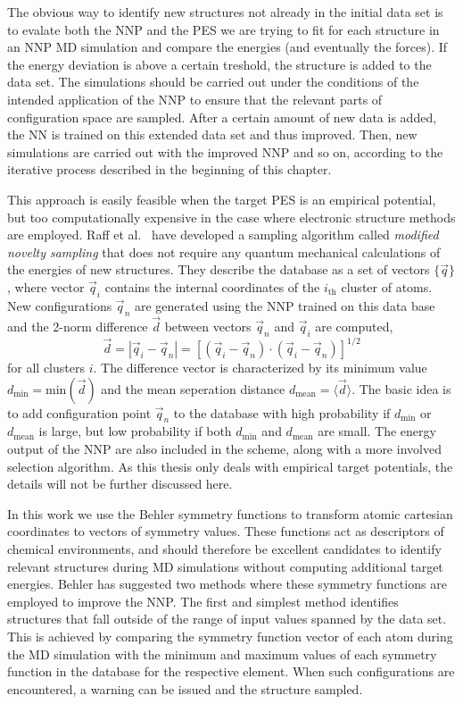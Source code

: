 \documentclass[twoside,english]{uiofysmaster}
\begin{document}
The obvious way to identify new structures not already in the initial data set is to evalate both the NNP and 
the PES we are trying to fit for each structure in an NNP MD simulation and compare the energies (and eventually 
the forces). If the energy deviation is above a certain treshold, the structure is added to the data set.
The simulations should be carried out under the conditions of the intended application of the NNP to ensure
that the relevant parts of configuration space are sampled.
After a certain amount of new data is added, 
the NN is trained on this extended data set and thus improved. Then, new simulations are carried out with the improved
NNP and so on, according to the iterative process described in the beginning of this chapter. 

This approach is easily feasible when the target PES is an empirical potential, but too computationally expensive 
in the case where electronic structure methods are employed. Raff et al.\ \cite{Raff05} have developed a sampling
algorithm called \textit{modified novelty sampling} that does not require any quantum mechanical calculations of
the energies of new structures. They describe the database as a set of vectors $\{\vec{q}\}$, where vector
$\vec{q}_i$ contains the internal coordinates of the $i_\textrm{th}$ cluster of atoms. New configurations
$\vec{q}_n$ are generated using the NNP trained on this data base and the 2-norm difference $\vec{d}$ between vectors
$\vec{q}_n$ and $\vec{q}_i$ are computed,
\begin{equation}
 \vec{d} = | \vec{q}_i - \vec{q}_n | = 
 \left[(\vec{q}_i - \vec{q}_n)\cdot(\vec{q}_i - \vec{q}_n)\right]^{1/2}
\end{equation}
for all clusters $i$. The difference vector is characterized by its minimum value $d_\textrm{min} = \textrm{min}(\vec{d})$ and 
the mean seperation distance $d_\textrm{mean} = \langle\vec{d}\rangle$. 
The basic idea is to add configuration point $\vec{q}_n$ to the database with high
probability if $d_\textrm{min}$ or $d_\textrm{mean}$ is large, but low probability if both 
$d_\textrm{min}$ and $d_\textrm{mean}$ are small. The energy output of the NNP are also included in the scheme, along with
a more involved selection algorithm. As this thesis only deals with empirical target potentials, the details will
not be further discussed here. 

In this work we use the Behler symmetry functions to transform atomic cartesian coordinates to vectors of symmetry values.
These functions act as descriptors of chemical environments, and should therefore be excellent candidates
to identify relevant structures during MD simulations without computing additional target energies. 
Behler has suggested two methods \cite{Behler11general} where these symmetry functions are employed to improve the NNP. 
The first and simplest method identifies structures that fall outside of the range of input values spanned by the data set. 
This is achieved by comparing the symmetry function vector of each atom during the MD simulation with 
the minimum and maximum values of each symmetry function in the database for the respective element. 
When such configurations are encountered, a warning can be issued and the structure sampled.  
\end{document}
